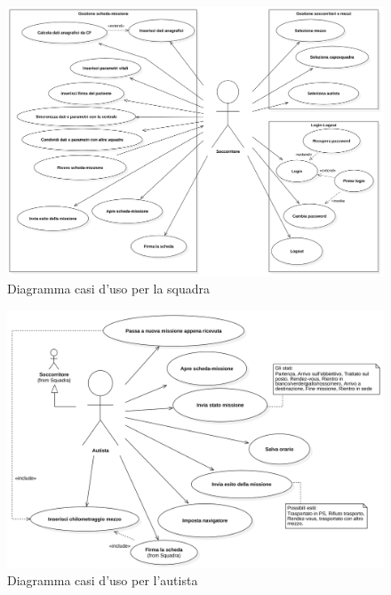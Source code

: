 \documentclass{article}
\begin{document}
    \begin{figure}
        \centering
        \includegraphics[width=6.5in]{diagrams/png/uc-soccorritore.png}
        \caption{Diagramma casi d'uso per la squadra}
        \label{fig:uc-rescueteam}
    \end{figure}
    \begin{figure}
        \centering
        \includegraphics[width=5in]{diagrams/png/uc-autista.png}
        \caption{Diagramma casi d'uso per l'autista}
        \label{fig:uc-autista}
    \end{figure}
\end{document}
